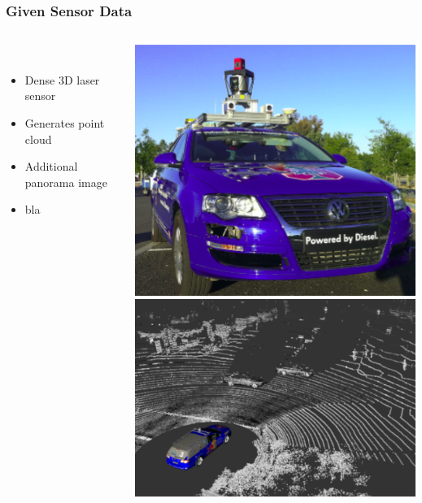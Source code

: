 \begin{frame}
  \frametitle{Given Sensor Data}

  \begin{columns}
  \begin{column}{0.6\textwidth}
  \begin{description}[]
  \item[Sensor] \hfill \\
  \begin{itemize}
  \item Dense 3D laser sensor
  \item Generates point cloud
  \item Additional panorama image
  \item bla
  \end{itemize}
  \end{description}
  \end{column}
  \begin{column}{0.4\textwidth}
  \includegraphics[width=\textwidth]{../img/lidar}\\
\bigskip
  \includegraphics[width=\textwidth]{../img/lidar-data}
  \end{column}
  \end{columns}
\end{frame}

